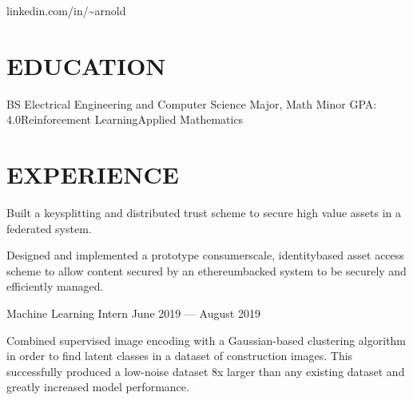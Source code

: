 \documentclass[10pt]{article}
\begin{document}
				 {linkedin.com/in/{\textasciitilde}arnold}      

\section*{EDUCATION}

    {BS {\textendash} Electrical Engineering and Computer Science Major, Math Minor}
{GPA: 4.0}{Reinforcement Learning}{Applied Mathematics}


\section*{EXPERIENCE}


                  \begin{accomplishments}
                \item Built a key{\textendash}splitting and distributed trust scheme to secure high value assets in a federated system.
                \item Designed and implemented a prototype consumer{\textendash}scale, identity{\textendash}based asset access scheme to allow content secured by an ethereum{\textendash}backed system to be securely and efficiently managed. 
                  \end{accomplishments}

                {Machine Learning Intern}
                {June 2019 --- August 2019}
                    \begin{accomplishments}
                        \item Combined supervised image encoding with a Gaussian-based clustering algorithm in order to find latent classes in a dataset of construction images. 
                          This successfully produced a low-noise dataset 8x larger than any existing dataset and greatly increased model performance.
                    \end{accomplishments}
\end{document}
